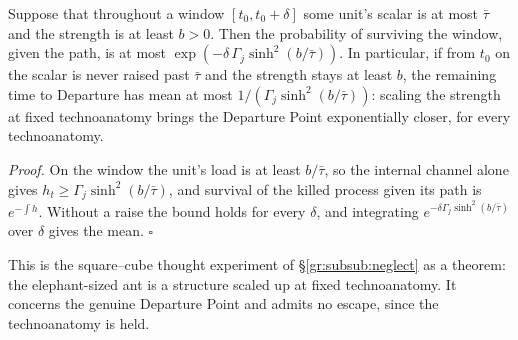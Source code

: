 \begin{theorem}
\label{gr1:thm:squarecube}
Suppose that throughout a window $[t_0,t_0+\delta]$ some unit's scalar is
at most $\bar\tau$ and the strength is at least $b>0$. Then the probability
of surviving the window, given the path, is at most
$\exp(-\delta\,\Gamma_j\sinh^2(b/\bar\tau))$. In particular, if from $t_0$
on the scalar is never raised past $\bar\tau$ and the strength stays at
least $b$, the remaining time to Departure has mean at most
$1/(\Gamma_j\sinh^2(b/\bar\tau))$: scaling the strength at fixed
technoanatomy brings the Departure Point exponentially closer, for every
technoanatomy.
\end{theorem}

\noindent\emph{Proof.} On the window the unit's load is at least
$b/\bar\tau$, so the internal channel alone gives
$h_t\ge\Gamma_j\sinh^2(b/\bar\tau)$, and survival of the killed process
given its path is $e^{-\int h}$. Without a raise the bound holds for every
$\delta$, and integrating $e^{-\delta\Gamma_j\sinh^2(b/\bar\tau)}$ over
$\delta$ gives the mean. $\square$

\noindent This is the square--cube thought experiment of \S\ref{gr:subsub:neglect} as a theorem: the
elephant-sized ant is a structure scaled up at fixed technoanatomy. It
concerns the genuine Departure Point and admits no escape, since the
technoanatomy is held.

